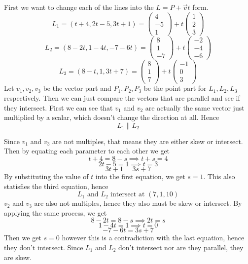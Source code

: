 \documentclass{article}
\begin{document}
\subsection{}
First we want to change each of the lines into the \(L = P + \vec{v}t\) form. 
\[L_1 = (t+4, 2t-5, 3t+1) = \begin{pmatrix} 4 \\ -5 \\ 1\end{pmatrix} + t \begin{pmatrix}
    1 \\ 2 \\ 3
\end{pmatrix} \]
\[L_2 = (8-2t, 1-4t, -7-6t) = \begin{pmatrix}
    8 \\ 1 \\ -7
\end{pmatrix} + t \begin{pmatrix}
    -2 \\ -4 \\ -6
\end{pmatrix} \]
\[L_3 = (8-t, 1, 3t+7) = \begin{pmatrix}
    8 \\ 1 \\ 7
\end{pmatrix} + t \begin{pmatrix}
    -1 \\ 0 \\ 3
\end{pmatrix} \]
Let \(v_1, v_2, v_3\) be the vector part and \(P_1, P_2, P_3\) be the point part for \(L_1, L_2, L_3\) respectively. Then we can just compare the vectors that are parallel and see if they intersect. First we can see that \(v_1\) and \(v_2\) are actually the same vector just multiplied by a scalar, which doesn't change the direction at all. Hence 
\[L_1 \parallel L_2\]

Since \(v_1\) and \(v_3\) are not multiples, that means they are either skew or intersect. Then by equating each parameter to each other we get 
\[t+4 = 8-s \implies t+s = 4\]
\[2t-5 = 1 \implies t=  3\]
\[3t+1 = 3s+7\]
By substituting the value of $t$ into the first equation, we get $s = 1$. This also statisfies the third equation, hence 
\[L_1 \text{ and } L_2 \text{ intersect at } (7,1,10)\]
$v_2$ and $v_3$ are also not multiples, hence they also must be skew or intersect. By applying the same process, we get 
\[8-2t = 8-s \implies 2t = s\]
\[1-4t=1 \implies t = 0\]
\[-7-6t = 3s+7\]
Then we get $s = 0$ however this is a contradiction with the last equation, hence they don't intersect. Since $L_1$ and $L_2$ don't intersect nor are they parallel, they are skew. 
\end{document}
